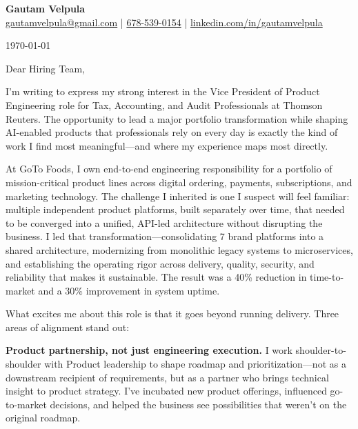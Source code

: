 \documentclass[11pt]{article}
\begin{document}
\begin{center}
    {\LARGE \textbf{Gautam Velpula}} \\[6pt]
    \href{mailto:gautamvelpula@gmail.com}{gautamvelpula@gmail.com} \;|\;
    \href{tel:6785390154}{678-539-0154} \;|\;
    \href{https://www.linkedin.com/in/gautamvelpula}{linkedin.com/in/gautamvelpula}
\end{center}

\vspace{14pt}

\today

\vspace{8pt}

Dear Hiring Team,

I'm writing to express my strong interest in the Vice President of Product Engineering role for Tax, Accounting, and Audit Professionals at Thomson Reuters. The opportunity to lead a major portfolio transformation while shaping AI-enabled products that professionals rely on every day is exactly the kind of work I find most meaningful---and where my experience maps most directly.

At GoTo Foods, I own end-to-end engineering responsibility for a portfolio of mission-critical product lines across digital ordering, payments, subscriptions, and marketing technology. The challenge I inherited is one I suspect will feel familiar: multiple independent product platforms, built separately over time, that needed to be converged into a unified, API-led architecture without disrupting the business. I led that transformation---consolidating 7 brand platforms into a shared architecture, modernizing from monolithic legacy systems to microservices, and establishing the operating rigor across delivery, quality, security, and reliability that makes it sustainable. The result was a 40\% reduction in time-to-market and a 30\% improvement in system uptime.

What excites me about this role is that it goes beyond running delivery. Three areas of alignment stand out:

\textbf{Product partnership, not just engineering execution.} I work shoulder-to-shoulder with Product leadership to shape roadmap and prioritization---not as a downstream recipient of requirements, but as a partner who brings technical insight to product strategy. I've incubated new product offerings, influenced go-to-market decisions, and helped the business see possibilities that weren't on the original roadmap.
\end{document}
